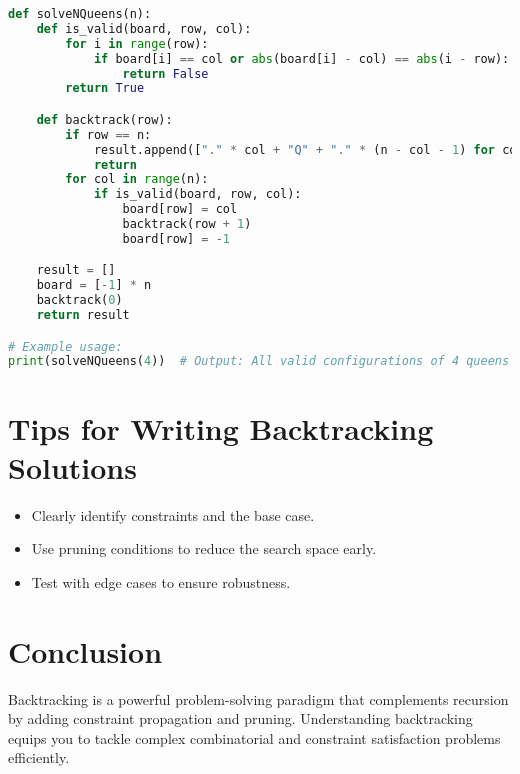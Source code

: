 \begin{fullwidth}
\begin{lstlisting}[language=Python]
def solveNQueens(n):
    def is_valid(board, row, col):
        for i in range(row):
            if board[i] == col or abs(board[i] - col) == abs(i - row):
                return False
        return True

    def backtrack(row):
        if row == n:
            result.append(["." * col + "Q" + "." * (n - col - 1) for col in board])
            return
        for col in range(n):
            if is_valid(board, row, col):
                board[row] = col
                backtrack(row + 1)
                board[row] = -1

    result = []
    board = [-1] * n
    backtrack(0)
    return result

# Example usage:
print(solveNQueens(4))  # Output: All valid configurations of 4 queens
\end{lstlisting}
\end{fullwidth}

\section*{Tips for Writing Backtracking Solutions}
\begin{itemize}
    \item Clearly identify constraints and the base case.
    \item Use pruning conditions to reduce the search space early.
    \item Test with edge cases to ensure robustness.
\end{itemize}

\section*{Conclusion}
Backtracking is a powerful problem-solving paradigm that complements recursion by adding constraint propagation and pruning. Understanding backtracking equips you to tackle complex combinatorial and constraint satisfaction problems efficiently.